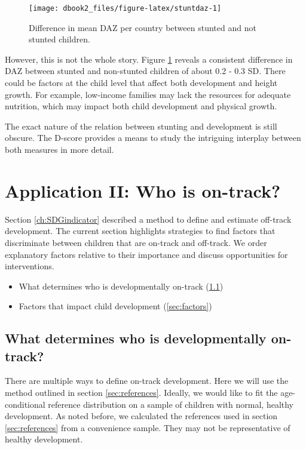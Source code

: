 \documentclass[
]{book}
\providecommand{\tightlist}{%
  \setlength{\itemsep}{0pt}\setlength{\parskip}{0pt}}
\begin{document}
\begin{figure}

{\centering \texttt{[image: dbook2\_files/figure-latex/stuntdaz-1]} 

}

\caption{Difference in mean DAZ per country between stunted and not stunted children.}\label{fig:stuntdaz}
\end{figure}



However, this is not the whole story. Figure \ref{fig:stuntdaz} reveals a consistent difference in DAZ between stunted and non-stunted children of about 0.2 - 0.3 SD. There could be factors at the child level that affect both development and height growth. For example, low-income families may lack the resources for adequate nutrition, which may impact both child development and physical growth.

The exact nature of the relation between stunting and development is still obscure. The D-score provides a means to study the intriguing interplay between both measures in more detail.

\hypertarget{ch:ontrack}{%
\chapter{Application II: Who is on-track?}\label{ch:ontrack}}

Section \ref{ch:SDGindicator} described a method to define and estimate off-track development. The current section highlights strategies to find factors that discriminate between children that are on-track and off-track. We order explanatory factors relative to their importance and discuss opportunities for interventions.

\begin{itemize}
\tightlist
\item
  What determines who is developmentally on-track (\ref{sec:application2})
\item
  Factors that impact child development (\ref{sec:factors})
\end{itemize}

\hypertarget{sec:application2}{%
\section{What determines who is developmentally on-track?}\label{sec:application2}}

There are multiple ways to define on-track development. Here we will use the method outlined in section \ref{sec:references}. Ideally, we would like to fit the age-conditional reference distribution on a sample of children with normal, healthy development. As noted before, we calculated the references used in section \ref{sec:references} from a convenience sample. They may not be representative of healthy development.
\end{document}
